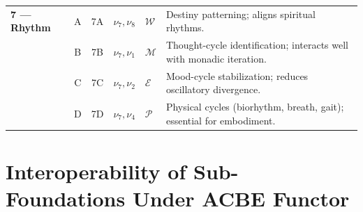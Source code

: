 \begin{longtable}{p{1.8cm}|c|c|p{1.5cm}|p{1.5cm}|p{4.5cm}}
\textbf{7 --- Rhythm}
& A & 7A &
$\nu_7, \nu_8$ &
$\mathcal{W}$ &
Destiny patterning; aligns spiritual rhythms.
\\
& B & 7B &
$\nu_7, \nu_1$ &
$\mathcal{M}$ &
Thought-cycle identification; interacts well with monadic iteration.
\\
& C & 7C &
$\nu_7, \nu_2$ &
$\mathcal{E}$ &
Mood-cycle stabilization; reduces oscillatory divergence.
\\
& D & 7D &
$\nu_7, \nu_4$ &
$\mathcal{P}$ &
Physical cycles (biorhythm, breath, gait); essential for embodiment.
\\

\end{longtable}
\normalsize

\section{Interoperability of Sub-Foundations Under ACBE Functor}

